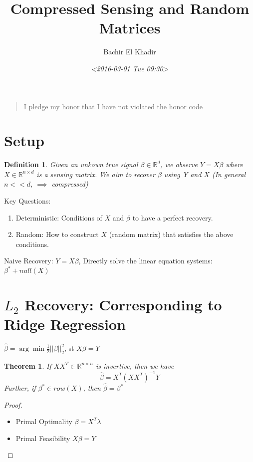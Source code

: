 \documentclass[11pt]{article}
\author{Bachir El Khadir}
\date{\textit{<2016-03-01 Tue 09:30>}}
\title{Compressed Sensing and Random Matrices}
\newtheorem{theorem}{Theorem}
\newtheorem{definition}{Definition}
\begin{document}
\maketitle
\tableofcontents

\begin{quote}
I pledge my honor that I have not violated the honor code
\end{quote}

\section{Setup}
\label{sec:orgheadline1}

\begin{definition}
Given an unkown true signal \(\beta \in \mathbb R^d\), we observe \(Y = X\beta\) where \(X \in \mathbb R^{n \times d}\) is a sensing matrix.
We aim to recover \(\beta\) using Y and \(X\) (In general \(n << d\), \(\implies\) compressed)
\label{orgspecialblock1}

\end{definition}

Key Questions:
\begin{enumerate}
\item Deterministic: Conditions of \(X\) and \(\beta\) to have a perfect recovery.
\item Random: How to construct \(X\) (random matrix) that satisfies the above conditions.
\end{enumerate}


Naive Recovery:
\(Y = X\beta\),  Directly solve the linear equation systems: \(\beta^* + null(X)\)

\section{\(L_2\) Recovery: Corresponding to Ridge Regression}
\label{sec:orgheadline2}

\(\hat \beta = \arg \min \frac12 ||\beta||_2^2\), st \(X\beta = Y\)

\begin{theorem}
If \(XX^T \in \mathbb R^{n \times n}\) is invertive, then we have 
$$\hat \beta = X^T (XX^T)^{-1} Y$$
Further, if \(\beta^* \in row(X)\), then \(\hat \beta = \beta^*\)
\label{orgspecialblock2}

\end{theorem}


\begin{proof}
\begin{itemize}
\item Primal Optimality \(\beta = X^T \lambda\)
\item Primal Feasibility \(X\beta = Y\)
\end{itemize}
\end{proof}
\end{document}
